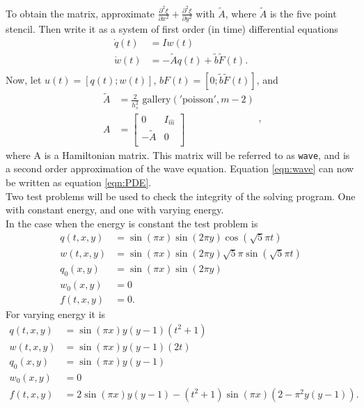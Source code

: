 To obtain the matrix, approximate $\frac{\partial^2 \xi}{\partial x^2}+ \frac{\partial^2 \xi}{\partial y^2}$ with $\tilde{A}$, where $\tilde{A}$ is the five point stencil\cite{fivepoint}. Then write it as a system of first order (in time) differential equations
\begin{equation*}
\begin{aligned}
\dot{q}(t) &= I w(t) \\
\dot{w}(t) & = -\tilde{A} q(t) + \tilde{b} \tilde{F}(t). \\
\end{aligned}
\end{equation*}
Now, let $u(t) = [q(t);w(t)]$, $ b F(t) =[0; \tilde{b} \tilde{F}(t)] $, and
\begin{equation*}
\begin{aligned}
\tilde{A} &= \frac{2}{h_s^2} \text{ gallery}('\text{poisson}', m-2) \\
A &= 
\begin{bmatrix}
 0 & I_{\hat{m}} \\ - \tilde{A} & 0 \\
\end{bmatrix}
\end{aligned},
\end{equation*}
where A is a Hamiltonian matrix. This matrix will be referred to as \texttt{wave}, and is a second order approximation of the wave equation. Equation \eqref{eqn:wave} can now be written as equation \eqref{eqn:PDE}. \\

Two test problems will be used to check the integrity of the solving program. One with constant energy, and one with varying energy. \\

In the case when the energy is constant the test problem is 
\begin{equation*}
\begin{aligned}
q(t,x,y) &= \sin(\pi x) \sin( 2 \pi y) \cos(\sqrt{5} \pi t) \\
w (t,x,y) &= \sin(\pi x) \sin( 2 \pi y) \sqrt{5} \pi \sin(\sqrt{5} \pi t) \\
q_0(x,y) &= \sin( \pi x) \sin(2 \pi y) \\
w_0(x,y) & = 0 \\
f(t,x,y) &= 0 .
\end{aligned}
\end{equation*}
For varying energy it is
\begin{equation*}
\begin{aligned}
q(t,x,y) &= \sin(\pi x) y (y-1) (t^2+1) \\
w(t,x,y) &= \sin(\pi x) y (y-1) (2 t) \\
q_0(x,y) &= \sin(\pi x) y (y-1) \\
w_0(x,y) & = 0 \\
f(t,x,y) & = 2  \sin(\pi x) y (y-1) -(t^2+1) \sin(\pi x) (2-\pi^2 y (y-1)).
\end{aligned}
\end{equation*}

